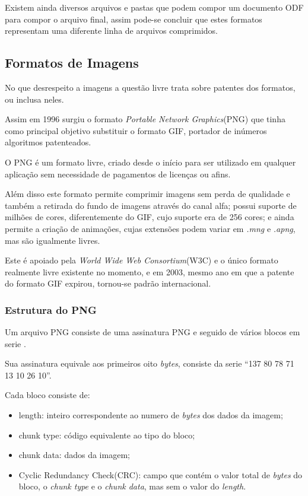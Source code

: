 Existem ainda diversos arquivos e pastas que podem compor um documento ODF para compor o arquivo final, assim pode-se concluir que estes formatos representam uma diferente linha de arquivos comprimidos.

\subsection{Formatos de Imagens}

No que desrespeito a imagens a questão livre trata sobre patentes dos formatos, ou inclusa neles.

Assim em 1996 surgiu o formato \textit{Portable Network Graphics}(PNG) que tinha como principal objetivo substituir o formato GIF, portador de inúmeros algoritmos patenteados.

O PNG é um formato livre, criado desde o início para ser utilizado em qualquer aplicação sem necessidade de pagamentos de licenças ou afins.

Além disso este formato permite comprimir imagens sem perda de qualidade e também a retirada do fundo de imagens através do canal alfa; possui suporte de milhões de cores, diferentemente do GIF, cujo suporte era de 256 cores; e ainda permite a criação de animações, cujas extensões podem variar em \textit{.mng} e \textit{.apng}, mas são igualmente livres.

Este é apoiado pela \textit{World Wide Web Consortium}(W3C) e o único formato realmente livre existente no momento, e em 2003, mesmo ano em que a patente do formato GIF expirou, tornou-se padrão internacional.

\subsubsection{Estrutura do PNG}

Um arquivo PNG consiste de uma assinatura PNG e seguido de vários blocos em serie \cite{PNG-DEVELOPMENT-GROUP}.

Sua assinatura equivale aos primeiros oito \textit{bytes}, consiste da serie “137 80 78 71 13 10 26 10”.

Cada bloco consiste de:

\begin{itemize}
    \item{length: inteiro correspondente ao numero de \textit{bytes} dos dados da imagem;}
    \item{chunk type: código equivalente ao tipo do bloco;}
    \item{chunk data: dados da imagem;}
    \item{Cyclic Redundancy Check(CRC): campo que contém o valor total de \textit{bytes} do bloco, o \textit{chunk type} e o \textit{chunk data}, mas sem o valor do \textit{length}.}
\end{itemize}

